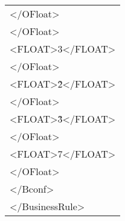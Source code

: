 \begin{center}
\begin{tabular}{|p{11cm}|}
\textless /OFloat\textgreater \\
\textless /OFloat\textgreater \\
\textless FLOAT\textgreater 3\textless /FLOAT\textgreater \\
\textless /OFloat\textgreater \\
\textless FLOAT\textgreater \~2\textless /FLOAT\textgreater \\
\textless /OFloat\textgreater \\
\textless FLOAT\textgreater \~3\textless /FLOAT\textgreater \\
\textless /OFloat\textgreater \\
\textless FLOAT\textgreater 7\textless /FLOAT\textgreater \\
\textless /OFloat\textgreater \\
\textless /Bconf\textgreater \\
\textless /BusinessRule\textgreater \\
 \hline
\end{tabular} \\
\end{center}

